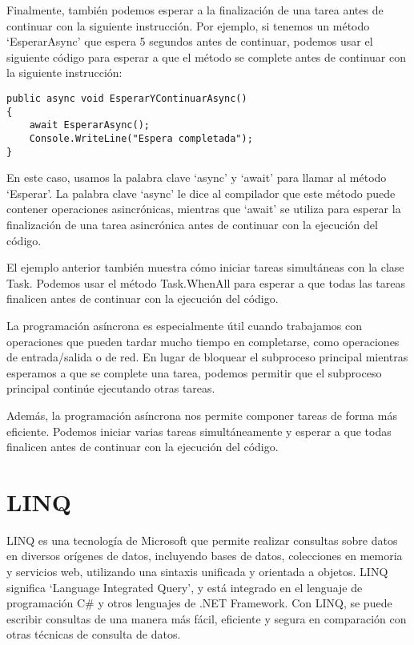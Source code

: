 \documentclass[executivepaper]{article}
\begin{document}
Finalmente, también podemos esperar a la finalización de una tarea antes de continuar con la siguiente instrucción. Por ejemplo, si tenemos un método \enquote*{EsperarAsync} que espera 5 segundos antes de continuar, podemos usar el siguiente código para esperar a que el método se complete antes de continuar con la siguiente instrucción:

\begin{lstlisting}
public async void EsperarYContinuarAsync()
{
    await EsperarAsync();
    Console.WriteLine("Espera completada");
}    
\end{lstlisting}

En este caso, usamos la palabra clave \enquote*{async} y \enquote*{await} para llamar al método \enquote*{Esperar}. La palabra clave \enquote*{async} le dice al compilador que este método puede contener operaciones asincrónicas, mientras que \enquote*{await} se utiliza para esperar la finalización de una tarea asincrónica antes de continuar con la ejecución del código.

El ejemplo anterior también muestra cómo iniciar tareas simultáneas con la clase Task. Podemos usar el método Task.WhenAll para esperar a que todas las tareas finalicen antes de continuar con la ejecución del código.

La programación asíncrona es especialmente útil cuando trabajamos con operaciones que pueden tardar mucho tiempo en completarse, como operaciones de entrada/salida o de red. En lugar de bloquear el subproceso principal mientras esperamos a que se complete una tarea, podemos permitir que el subproceso principal continúe ejecutando otras tareas.

Además, la programación asíncrona nos permite componer tareas de forma más eficiente. Podemos iniciar varias tareas simultáneamente y esperar a que todas finalicen antes de continuar con la ejecución del código.

\newpage
\section{LINQ}

LINQ es una tecnología de Microsoft que permite realizar consultas sobre datos en diversos orígenes de datos, incluyendo bases de datos, colecciones en memoria y servicios web, utilizando una sintaxis unificada y orientada a objetos. LINQ significa \enquote*{Language Integrated Query}, y está integrado en el lenguaje de programación C\# y otros lenguajes de .NET Framework. Con LINQ, se puede escribir consultas de una manera más fácil, eficiente y segura en comparación con otras técnicas de consulta de datos.
\end{document}
